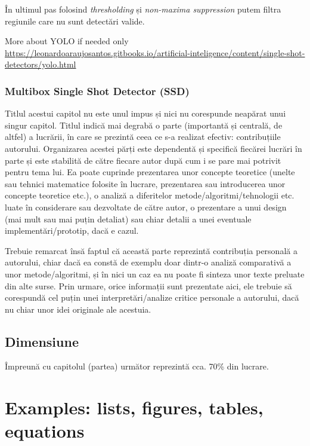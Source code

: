 În ultimul pas folosind \textit{thresholding} și \textit{non-maxima suppression} putem filtra regiunile care nu sunt detectări valide.


More about YOLO if needed only
\url{https://leonardoaraujosantos.gitbooks.io/artificial-inteligence/content/single-shot-detectors/yolo.html}

\subsubsection{Multibox Single Shot Detector (SSD)}	






Titlul acestui capitol nu este unul impus și nici nu corespunde neapărat unui singur capitol. Titlul indică mai degrabă o parte (importantă și centrală, de altfel) a lucrării, în care se prezintă ceea ce s-a realizat efectiv: contribuțiile autorului. Organizarea acestei părți este dependentă și specifică fiecărei lucrări în parte și este stabilită de către fiecare autor după cum i se pare mai potrivit pentru tema lui. Ea poate cuprinde prezentarea unor concepte teoretice (unelte sau tehnici matematice folosite în lucrare, prezentarea sau introducerea unor concepte teoretice etc.), o analiză a diferitelor metode/algoritmi/tehnologii etc. luate în considerare sau dezvoltate de către autor, o prezentare a unui design (mai mult sau mai puțin detaliat) sau chiar detalii a unei eventuale implementări/prototip, dacă e cazul.

Trebuie remarcat însă faptul că această parte reprezintă contribuția personală a autorului, chiar dacă ea constă de exemplu doar dintr-o analiză comparativă a unor metode/algoritmi, și în nici un caz ea nu poate fi sinteza unor texte preluate din alte surse. Prin urmare, orice informații sunt prezentate aici, ele trebuie să corespundă cel puțin unei interpretări/analize critice personale a autorului, dacă nu chiar unor idei originale ale acestuia. 

\subsection{Dimensiune}

Împreună cu capitolul (partea) următor reprezintă cca. 70\% din lucrare. 


\section{Examples: lists, figures, tables, equations}

